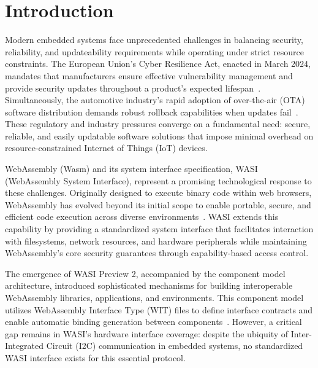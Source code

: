 \chapter{Introduction}
\label{chap:introduction}

Modern embedded systems face unprecedented challenges in balancing security, reliability, and updateability requirements while operating under strict resource constraints. The European Union's Cyber Resilience Act, enacted in March 2024, mandates that manufacturers ensure effective vulnerability management and provide security updates throughout a product's expected lifespan~\cite{eu_cyber_res_act}. Simultaneously, the automotive industry's rapid adoption of over-the-air (OTA) software distribution demands robust rollback capabilities when updates fail~\cite{automotive_ota}. These regulatory and industry pressures converge on a fundamental need: secure, reliable, and easily updatable software solutions that impose minimal overhead on resource-constrained Internet of Things (IoT) devices.

WebAssembly (Wasm) and its system interface specification, WASI (WebAssembly System Interface), represent a promising technological response to these challenges. Originally designed to execute binary code within web browsers, WebAssembly has evolved beyond its initial scope to enable portable, secure, and efficient code execution across diverse environments~\cite{wasm_spec}. WASI extends this capability by providing a standardized system interface that facilitates interaction with filesystems, network resources, and hardware peripherals while maintaining WebAssembly's core security guarantees through capability-based access control.


The emergence of WASI Preview 2, accompanied by the component model architecture, introduced sophisticated mechanisms for building interoperable WebAssembly libraries, applications, and environments. This component model utilizes WebAssembly Interface Type (WIT) files to define interface contracts and enable automatic binding generation between components~\cite{wasi_p2}. However, a critical gap remains in WASI's hardware interface coverage: despite the ubiquity of Inter-Integrated Circuit (I2C) communication in embedded systems, no standardized WASI interface exists for this essential protocol.

